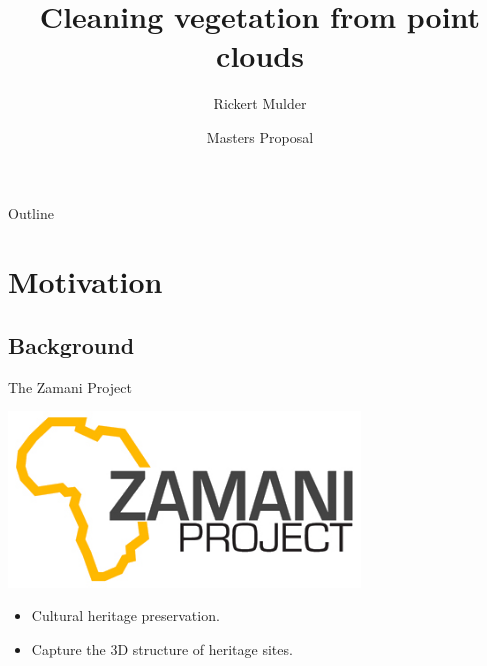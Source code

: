 \documentclass{beamer}
\title{Cleaning vegetation from point clouds}
\author{Rickert Mulder}
\institute[U of X]
{
  Department of Computer Science\\
  University of Cape Town
}
\date[CFP 2003] %
{Masters Proposal}
\begin{document}
\begin{frame}
  \titlepage
\end{frame}

\begin{frame}{Outline}
  \tableofcontents
\end{frame}





\section{Motivation}

\subsection{Background}

\begin{frame}{The Zamani Project}

  \includegraphics[width=0.70\textwidth]{pics/Zamani_logo}

  \begin{itemize}
  \item
    Cultural heritage preservation.
  \item
    Capture the 3D structure of heritage sites.
  \end{itemize}
\end{frame}
\end{document}
